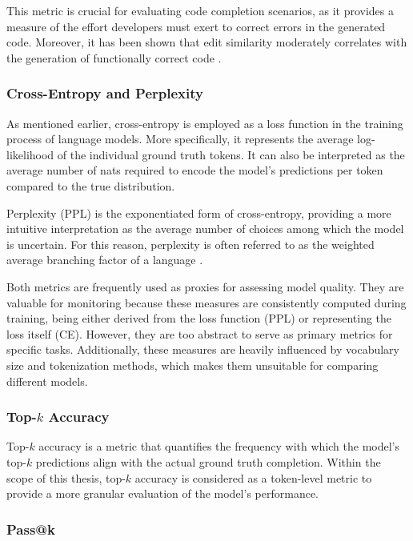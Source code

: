 This metric is crucial for evaluating code completion scenarios, as it provides a measure of the effort developers must exert to correct errors in the generated code. Moreover, it has been shown that edit similarity moderately correlates with the generation of functionally correct code \parencite{dibia2022}.

\subsubsection*{Cross-Entropy and Perplexity}

As mentioned earlier, cross-entropy is employed as a loss function in the training process of language models. More specifically, it represents the average log-likelihood of the individual ground truth tokens. It can also be interpreted as the average number of nats required to encode the model's predictions per token compared to the true distribution.

Perplexity (PPL) is the exponentiated form of cross-entropy, providing a more intuitive interpretation as the average number of choices among which the model is uncertain. For this reason, perplexity is often referred to as the weighted average branching factor of a language \parencite{murphy2022}.

Both metrics are frequently used as proxies for assessing model quality. They are valuable for monitoring because these measures are consistently computed during training, being either derived from the loss function (PPL) or representing the loss itself (CE). However, they are too abstract to serve as primary metrics for specific tasks. Additionally, these measures are heavily influenced by vocabulary size and tokenization methods, which makes them unsuitable for comparing different models.

\subsubsection*{Top-\(k\) Accuracy}

Top-\(k\) accuracy is a metric that quantifies the frequency with which the model's top-\(k\) predictions align with the actual ground truth completion. Within the scope of this thesis, top-\(k\) accuracy is considered as a token-level metric to provide a more granular evaluation of the model's performance.

\subsubsection*{Pass@k}

